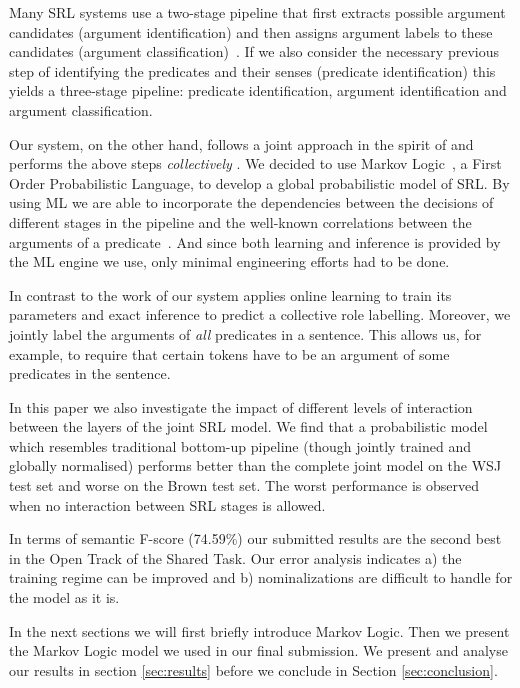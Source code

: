 
 
Many SRL systems use a two-stage pipeline that first extracts possible argument candidates (argument identification) and then assigns argument labels to these candidates (argument classification)~\citep{xue04calibrating}. If we also consider the necessary previous step of identifying the predicates and their senses (predicate identification) this yields a three-stage pipeline: predicate identification, argument identification and argument classification. 

Our system, on the other hand, follows a joint approach in the spirit of \cite{toutanova05joint} and performs the above steps \emph{collectively} . We decided to use Markov Logic~\citep[ML,][]{richardson05markov}, a First Order Probabilistic Language, to develop a global probabilistic model of SRL. By using ML we are able to incorporate the dependencies between the decisions of different stages in the pipeline and the well-known correlations between the arguments of a predicate~\citep{punyakanok05generalized}. And since both learning and inference is provided by the ML engine we use, only minimal engineering efforts had to be done.

In contrast to the work of \cite{toutanova05joint} our system applies online learning to train its parameters and exact inference to predict a collective role labelling. Moreover, we jointly label the arguments of \emph{all} predicates in a sentence. This allows us, for example, to require that certain tokens have to be an argument of some predicates in the sentence.  

In this paper we also investigate the impact of different levels of interaction between the layers of the joint SRL model. We find that a probabilistic model which resembles traditional bottom-up pipeline (though jointly trained and globally normalised) performs better than the complete joint model on the WSJ test set and worse on the Brown test set. The worst performance is observed when no interaction between SRL stages is allowed.

In terms of semantic F-score (74.59\%) our submitted results are the second best in the Open Track of the Shared Task. Our error analysis indicates a) the training regime can be improved and b) nominalizations are difficult to handle for the model as it is. 

In the next sections we will first briefly introduce Markov Logic. Then we present the Markov Logic model we used in our final submission. We present and analyse our results in section \ref{sec:results} before we conclude in Section \ref{sec:conclusion}.


